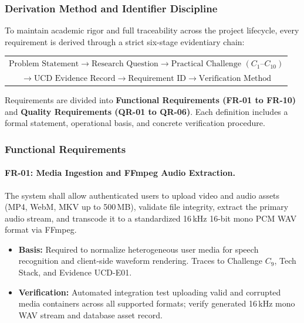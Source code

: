 \documentclass[conference]{IEEEtran}
\begin{document}
\subsubsection{Derivation Method and Identifier Discipline}
\label{sec:design:req:method}
To maintain academic rigor and full traceability across the project lifecycle, every requirement is derived through a strict six-stage evidentiary chain:
\begin{center}
\small
\begin{tabular}{@{}c@{}}
\footnotesize $\text{Problem Statement} \rightarrow \text{Research Question} \rightarrow \text{Practical Challenge } (C_1\text{--}C_{10})$\\
\footnotesize $\rightarrow \text{UCD Evidence Record} \rightarrow \text{Requirement ID} \rightarrow \text{Verification Method}$
\end{tabular}
\end{center}
Requirements are divided into \textbf{Functional Requirements (FR-01 to FR-10)} and \textbf{Quality Requirements (QR-01 to QR-06)}. Each definition includes a formal statement, operational basis, and concrete verification procedure.

\subsubsection{Functional Requirements}
\label{sec:design:req:fr}

\paragraph{FR-01: Media Ingestion and FFmpeg Audio Extraction.}
The system shall allow authenticated users to upload video and audio assets (MP4, WebM, MKV up to 500\,MB), validate file integrity, extract the primary audio stream, and transcode it to a standardized 16\,kHz 16-bit mono PCM WAV format via FFmpeg.
\begin{itemize}
    \item \textbf{Basis:} Required to normalize heterogeneous user media for speech recognition and client-side waveform rendering. Traces to Challenge $C_9$, Tech Stack, and Evidence UCD-E01.
    \item \textbf{Verification:} Automated integration test uploading valid and corrupted media containers across all supported formats; verify generated 16\,kHz mono WAV stream and database asset record.
\end{itemize}
\end{document}
